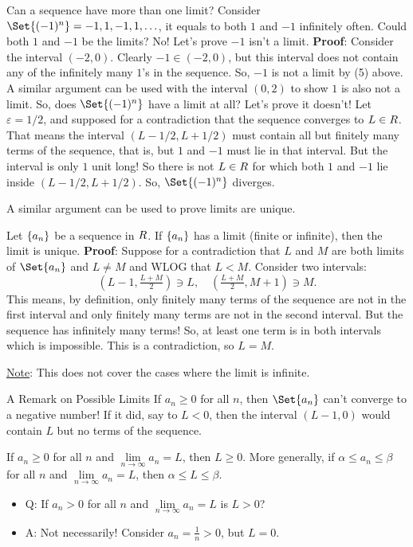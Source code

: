 \begin{Example}{}{}
    Can a sequence have more than one limit?
    Consider $ \Set{(-1)^n}=-1,1,-1,1,\ldots $, it equals to both $ 1 $ and $ -1 $ infinitely often. Could both $ 1 $ and $ -1 $
    be the limits? No! Let's prove $ -1 $ isn't a limit.
    \tcblower{}
    \textbf{Proof}: Consider the interval $ (-2,0) $. Clearly $ -1\in(-2,0) $, but
    this interval does not contain any of the infinitely many $ 1 $'s in the sequence. So, $ -1 $
    is not a limit by (5) above. A similar argument can be used with the interval $ (0,2) $ to show
    $ 1 $ is also not a limit. So, does $ \Set{(-1)^n} $ have a limit at all? Let's prove it doesn't!
    Let $ \varepsilon=1/2 $, and supposed for a contradiction that the sequence converges to $ L\in\relax{R} $. That means
    the interval $ (L-1/2,L+1/2) $ must contain all but finitely many terms of the sequence, that is, but $ 1 $ and $ -1 $
    must lie in that interval. But the interval is only $ 1 $ unit long! So there is not $ L\in\relax{R} $ for which both $ 1 $ and $ -1 $
    lie inside $ (L-1/2,L+1/2) $. So, $ \Set{(-1)^n} $ diverges.
\end{Example}
A similar argument can be used to prove limits are unique.
\begin{Theorem}{}{}
    Let $ \{a_n\} $ be a sequence in $ \relax{R} $. If $ \{a_n\} $ has a limit (finite or infinite), then the limit is unique.
    \tcblower{}
    \textbf{Proof}: Suppose for a contradiction that $ L $ and $ M $
    are both limits of $ \Set{a_n} $ and $ L\ne M $ and WLOG that $ L<M $. Consider two intervals:
    \[ (L-1,\tfrac{L+M}{2})\ni L,\quad (\tfrac{L+M}{2},M+1)\ni M. \]
    This means, by definition, only finitely many terms of the sequence are not in the first interval and only finitely
    many terms are not in the second interval. But the sequence has infinitely many terms! So, at least one term is in both intervals
    which is impossible. This is a contradiction, so $ L=M $.

    \underline{Note}: This does not cover the cases where the limit is infinite.
\end{Theorem}
\begin{Remark}{A Remark on Possible Limits}{}
    If $ a_n\ge 0 $ for all $ n $, then $ \Set{a_n} $ can't converge to a negative number! If it did, say to $ L<0 $,
    then the interval $ (L-1,0) $ would contain $ L $ but no terms of the sequence.
\end{Remark}
\begin{Theorem}{}{}
    If $ a_n\ge 0 $ for all $ n $ and $ \lim\limits_{{n} \to {\infty}}a_n=L $, then $ L\ge 0 $.
    More generally, if $ \alpha\le a_n\le \beta $ for all $ n $ and $ \lim\limits_{{n} \to {\infty}}a_n=L $,
    then $ \alpha\le L\le \beta $.
\end{Theorem}
\begin{itemize}
    \item Q\@: If $ a_n>0 $ for all $ n $ and $ \lim\limits_{{n} \to {\infty}}a_n=L $ is $ L>0 $?
    \item A\@: Not necessarily! Consider $ a_n=\frac{1}{n}>0 $, but $ L=0 $.
\end{itemize}
